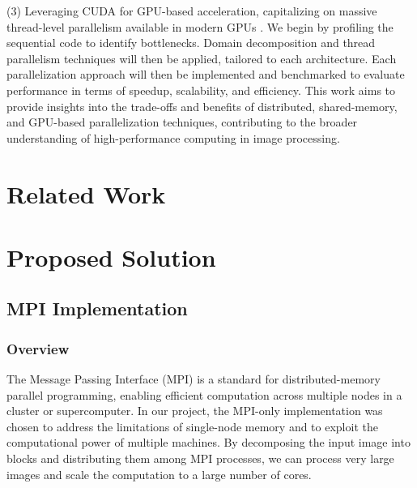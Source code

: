 \documentclass[conference, 10pt]{IEEEtran}
\begin{document}
(3) Leveraging CUDA for GPU-based acceleration,
capitalizing on massive thread-level parallelism available in modern GPUs \cite{nvidia2021cuda}.
We begin by profiling the sequential code to identify bottlenecks. 
Domain decomposition and thread parallelism techniques will then be applied, tailored to each architecture. 
Each parallelization approach will then be implemented and benchmarked 
to evaluate performance in terms of speedup, scalability, and efficiency.
This work aims to provide insights into the trade-offs and benefits of distributed, shared-memory, and GPU-based parallelization techniques, 
contributing to the broader understanding of high-performance computing in image processing.


\section{Related Work}




\section{Proposed Solution}

\subsection{MPI Implementation}
\subsubsection{Overview}
The Message Passing Interface (MPI) is a standard for distributed-memory parallel programming, enabling efficient computation across multiple nodes in a cluster or supercomputer. In our project, the MPI-only implementation was chosen to address the limitations of single-node memory and to exploit the computational power of multiple machines. By decomposing the input image into blocks and distributing them among MPI processes, we can process very large images and scale the computation to a large number of cores.
\end{document}
